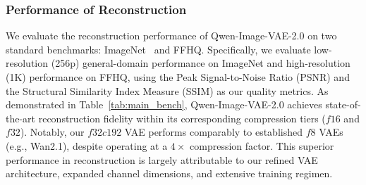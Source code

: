 \subsubsection{Performance of Reconstruction}
We evaluate the reconstruction performance of Qwen-Image-VAE-2.0 on two standard benchmarks: ImageNet~\citep{deng2009imagenet} and FFHQ\citep{Karras2018ASG}. Specifically, we evaluate low-resolution (256p) general-domain performance on ImageNet and high-resolution (1K) performance on FFHQ, using the Peak Signal-to-Noise Ratio (PSNR) and the Structural Similarity Index Measure (SSIM) as our quality metrics. As demonstrated in Table~\ref{tab:main_bench}, Qwen-Image-VAE-2.0 achieves state-of-the-art reconstruction fidelity within its corresponding compression tiers ($f16$ and $f32$). Notably, our $f32c192$ VAE performs comparably to established $f8$ VAEs (e.g., Wan2.1), despite operating at a $4\times$ compression factor. This superior performance in reconstruction is largely attributable to our refined VAE architecture, expanded channel dimensions, and extensive training regimen. 


